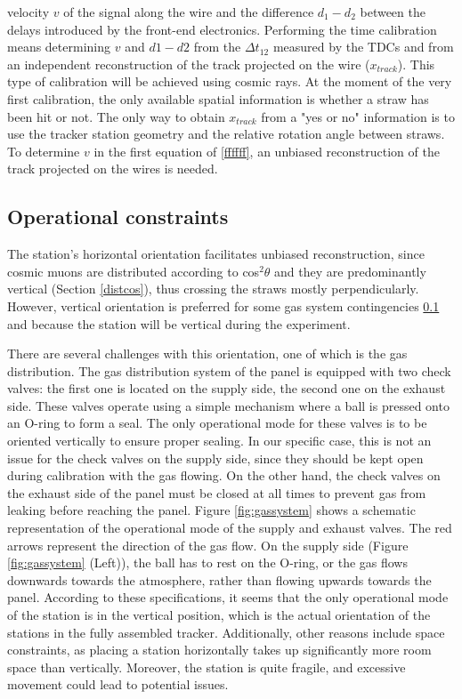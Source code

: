 velocity $v$ of the signal along the wire and 
the difference $d_1-d_2$ between the delays introduced by 
the front-end electronics. 
Performing the time calibration means 
determining $v$ and $d1-d2$ from the $\Delta t_{12}$ 
measured by the TDCs and from an independent 
reconstruction of the track 
projected on the wire ($x_{track}$).
This type of calibration will be 
achieved using cosmic rays. 
At the moment of the very first calibration, 
the only available spatial information is 
whether a straw has been hit or not. The 
only way to obtain $x_{track}$ from a "yes or no" 
information is to use the tracker station 
geometry and the relative rotation angle between straws. 
To determine $v$ in the first equation of \ref{ffffff}, 
an unbiased reconstruction of the 
track projected on the wires is needed.


\subsection{Operational constraints}\label{gassystem}
The station's horizontal orientation 
facilitates unbiased 
reconstruction, since cosmic muons 
are distributed according to 
cos$^2\theta$ and they are predominantly vertical 
(Section \ref{distcos}), 
thus crossing the straws mostly perpendicularly.
However, vertical orientation is preferred 
for some gas system contingencies 
\ref{gassystem} and because the station will 
be vertical during the experiment. 

There are several challenges with this orientation, 
one of which is the gas distribution. 
The gas distribution 
system of the panel is equipped 
with two check valves: the first one is located on 
the supply side, the second one on the exhaust side. 
These valves operate using a simple mechanism where 
a ball is pressed onto an O-ring to form a seal. The 
only operational mode for these valves is to be oriented 
vertically to ensure proper sealing. In our specific 
case, this is not an issue for the check valves on the 
supply side, since they should be kept open during 
calibration with the gas flowing. On the other hand, 
the check valves on the exhaust side of the panel must 
be closed at all times to prevent gas from leaking before 
reaching the panel. 
Figure \ref{fig:gassystem} shows a schematic 
representation of the operational mode of the supply 
and exhaust valves. The red arrows represent the 
direction of the gas flow. On the supply side (Figure 
\ref{fig:gassystem} (Left)), the ball has to rest on the 
O-ring, or the gas flows downwards towards the atmosphere, 
rather than flowing upwards towards the panel. According 
to these specifications, it seems that the only operational 
mode of the station is in the vertical position, which is 
the actual orientation of the stations in the fully assembled 
tracker. 
Additionally, other reasons include space 
constraints, as placing 
a station horizontally takes up 
significantly more room space than 
vertically. Moreover, the station 
is quite fragile, and 
excessive movement could lead to potential issues.

